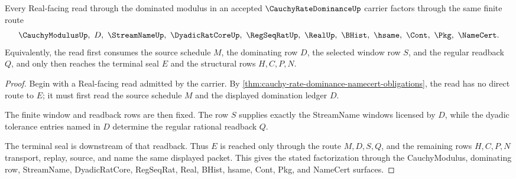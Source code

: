 \begin{theorem}
\label{thm:cauchy-rate-dominance-real-seal-handoff}
Every Real-facing read through the dominated modulus in an accepted $\CauchyRateDominanceUp$ carrier factors through the same finite route
$$
\CauchyModulusUp,\ D,\ \StreamNameUp,\ \DyadicRatCoreUp,\ \RegSeqRatUp,\ \RealUp,\ \BHist,\ \hsame,\ \Cont,\ \Pkg,\ \NameCert .
$$
Equivalently, the read first consumes the source schedule $M$, the dominating row $D$, the selected window row $S$, and the regular readback $Q$, and only then reaches the terminal seal $E$ and the structural rows $H,C,P,N$.
\end{theorem}
\begin{proof}
Begin with a Real-facing read admitted by the carrier. By \autoref{thm:cauchy-rate-dominance-namecert-obligations}, the read has no direct route to $E$; it must first read the source schedule $M$ and the displayed domination ledger $D$.

The finite window and readback rows are then fixed. The row $S$ supplies exactly the StreamName windows licensed by $D$, while the dyadic tolerance entries named in $D$ determine the regular rational readback $Q$.

The terminal seal is downstream of that readback. Thus $E$ is reached only through the route $M,D,S,Q$, and the remaining rows $H,C,P,N$ transport, replay, source, and name the same displayed packet. This gives the stated factorization through the CauchyModulus, dominating row, StreamName, DyadicRatCore, RegSeqRat, Real, BHist, hsame, Cont, Pkg, and NameCert surfaces.
\end{proof}



